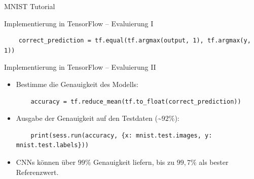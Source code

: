 \documentclass[utf8, smaller, c]{beamer}
\begin{document}
\begin{frame}{MNIST Tutorial}
\begin{block}{Implementierung in TensorFlow -- Evaluierung I}
\begin{itemize}
			\begin{lstlisting}
	correct_prediction = tf.equal(tf.argmax(output, 1), tf.argmax(y, 1))
			\end{lstlisting}
		\end{itemize}
	\end{block}
	
	\framebreak
	
	\begin{block}{Implementierung in TensorFlow -- Evaluierung II}
		\begin{itemize}
			\item Bestimme die Genauigkeit des Modells:
			\begin{lstlisting}
	accuracy = tf.reduce_mean(tf.to_float(correct_prediction))
			\end{lstlisting}
			\item Ausgabe der Genauigkeit auf den Testdaten (\textasciitilde$92\%$):
			\begin{lstlisting}
	print(sess.run(accuracy, {x: mnist.test.images, y: mnist.test.labels}))
			\end{lstlisting}
			\item CNNs können über $99\%$ Genauigkeit liefern, bis zu $99,7\%$ als bester Referenzwert.
		\end{itemize}
	\end{block}
\end{frame}
\fi
\end{document}
